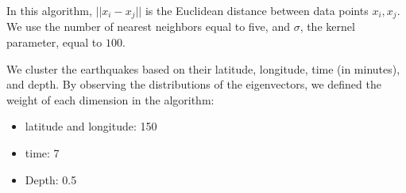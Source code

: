 In this algorithm, $||x_i-x_j||$ is the Euclidean distance between
data points $x_i,x_j$. We use the number of nearest neighbors equal to
five, and $\sigma$, the kernel parameter, equal to $100$.

We cluster the earthquakes based on their latitude, longitude, time
(in minutes), and depth. By observing the distributions of the
eigenvectors, we defined the weight of each dimension in the algorithm:

\begin{itemize}
\item latitude and longitude: 150
\item time: 7
\item Depth: 0.5
\end{itemize}
